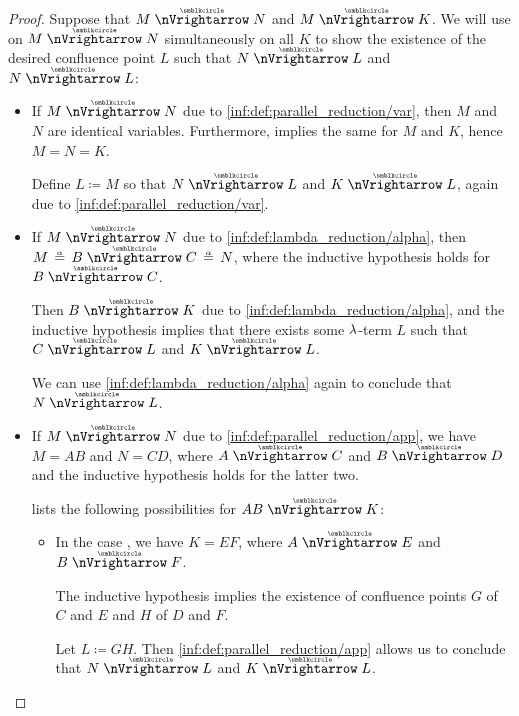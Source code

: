 \begin{proof}
   Suppose that \( M \ppred N \) and \( M \ppred K \). We will use  on \( M \ppred N \) simultaneously on all \( K \) to show the existence of the desired confluence point \( L \) such that \( N \ppred L \) and \( N \ppred L \):
  \begin{itemize}
    \item If \( M \ppred N \) due to \ref{inf:def:parallel_reduction/var}, then \( M \) and \( N \) are identical variables. Furthermore,  implies the same for \( M \) and \( K \), hence \( M = N = K \).

    Define \( L \coloneqq M \) so that \( N \ppred L \) and \( K \ppred L \), again due to \ref{inf:def:parallel_reduction/var}.

    \item If \( M \ppred N \) due to \ref{inf:def:lambda_reduction/alpha}, then \( M \aequiv B \ppred C \aequiv N \), where the inductive hypothesis holds for \( B \ppred C \).

    Then \( B \ppred K \) due to \ref{inf:def:lambda_reduction/alpha}, and the inductive hypothesis implies that there exists some \( \mathrm{\lambda} \)-term \( L \) such that \( C \ppred L \) and \( K \ppred L \).

    We can use \ref{inf:def:lambda_reduction/alpha} again to conclude that \( N \ppred L \).

    \item If \( M \ppred N \) due to \ref{inf:def:parallel_reduction/app}, we have \( M = AB \) and \( N = CD \), where \( A \ppred C \) and \( B \ppred D \) and the inductive hypothesis holds for the latter two.

     lists the following possibilities for \( AB \ppred K \):
    \begin{itemize}
      \item In the case , we have \( K = EF \), where \( A \ppred E \) and \( B \ppred F \).

      The inductive hypothesis implies the existence of confluence points \( G \) of \( C \) and \( E \) and \( H \) of \( D \) and \( F \).

      Let \( L \coloneqq GH \). Then \ref{inf:def:parallel_reduction/app} allows us to conclude that \( N \ppred L \) and \( K \ppred L \).


\end{itemize}
\end{itemize}
\end{proof}
